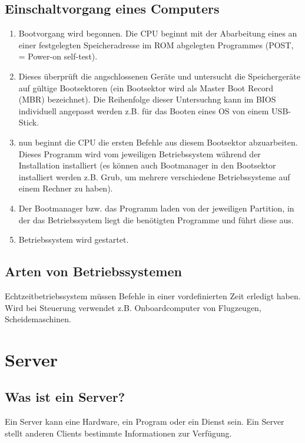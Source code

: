 \documentclass[a4paper]{report}
\begin{document}
\section{Einschaltvorgang eines Computers}

	\begin{enumerate}
	\item Bootvorgang wird begonnen. Die CPU beginnt mit der Abarbeitung eines an einer festgelegten Speicheradresse im ROM abgelegten Programmes (POST,
	= Power-on self-test).
	\item Dieses überprüft die angschlossenen Geräte und untersucht die Speichergeräte auf gültige
	Bootsektoren (ein Bootsektor wird als Master Boot Record (MBR) bezeichnet). Die Reihenfolge dieser Untersuchng kann im BIOS individuell angepasst 			werden z.B. für das Booten eines OS von einem USB-Stick.
	\item nun beginnt die CPU die ersten Befehle aus diesem Bootsektor abzuarbeiten. Dieses Programm wird vom jeweiligen Betriebssystem während der
	Installation installiert (es können auch Bootmanager in den Bootsektor installiert werden z.B. Grub, um mehrere verschiedene Betriebssysteme auf
	einem Rechner zu haben).
	\item Der Bootmanager bzw. das Programm laden von der jeweiligen Partition, in der das Betriebssystem liegt die benötigten Programme und führt
	diese aus. 
	\item Betriebssystem wird gestartet.
	\end{enumerate}

\section{Arten von Betriebssystemen}

Echtzeitbetriebssystem müssen Befehle in einer vordefinierten Zeit erledigt haben. Wird bei Steuerung verwendet z.B. Onboardcomputer von Flugzeugen, Scheidemaschinen.

\chapter{Server}

\section{Was ist ein Server?}

Ein Server kann eine Hardware, ein Program oder ein Dienst sein.
Ein Server stellt anderen Clients bestimmte Informationen zur Verfügung.
\end{document}
